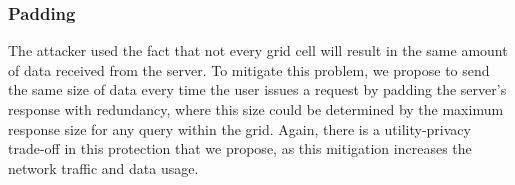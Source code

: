 \documentclass[9pt,conference]{IEEEtran}
\begin{document}
\subsubsection{Padding}
The attacker used the fact that not every grid cell will result in the same amount of data received from the server. To mitigate this problem, we propose to send the same size of data every time the user issues a request by padding the server's response with redundancy, where this size could be determined by the maximum response size for any query within the grid. Again, there is a utility-privacy trade-off in this protection that we propose, as this mitigation increases the network traffic and data usage.



\end{document}
